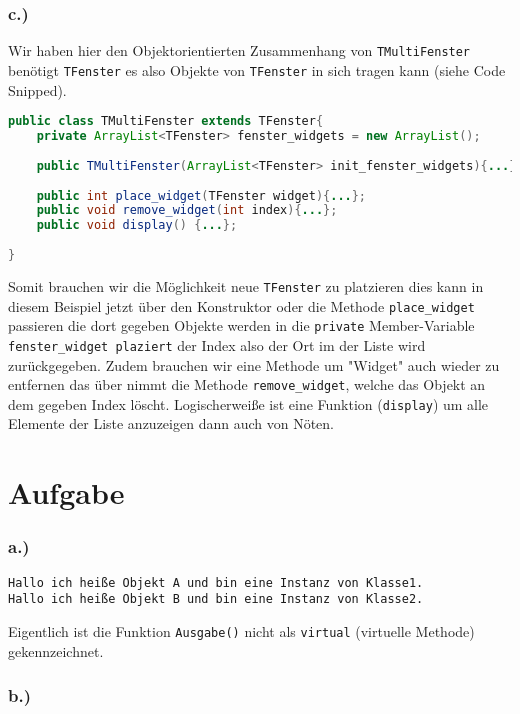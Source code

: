 \documentclass[12pt]{article}
\begin{document}
\subsubsection*{c.)}
Wir haben hier den Objektorientierten Zusammenhang von \verb|TMultiFenster| benötigt \verb|TFenster| es also Objekte von \verb|TFenster| in sich tragen kann (siehe Code Snipped).

\lstset{language=Java}
\begin{lstlisting}[language=Java]
public class TMultiFenster extends TFenster{
	private ArrayList<TFenster> fenster_widgets = new ArrayList();
	
	public TMultiFenster(ArrayList<TFenster> init_fenster_widgets){...};
	
	public int place_widget(TFenster widget){...};
	public void remove_widget(int index){...};
	public void display() {...};	
	
}
\end{lstlisting}

Somit brauchen wir die Möglichkeit neue \verb|TFenster| zu platzieren dies kann in diesem Beispiel jetzt über den Konstruktor oder die Methode \verb|place_widget| passieren die dort gegeben Objekte werden in die \verb|private| Member-Variable \verb|fenster_widget plaziert| der Index also der Ort im der Liste wird zurückgegeben. Zudem brauchen wir eine Methode um "Widget" auch wieder zu entfernen das über nimmt die Methode \verb|remove_widget|, welche das Objekt an dem gegeben Index löscht. Logischerweiße ist eine Funktion (\verb|display|) um alle Elemente der Liste anzuzeigen dann auch von Nöten.

\section*{Aufgabe}
\subsubsection*{a.)}


\begin{lstlisting}
Hallo ich heiße Objekt A und bin eine Instanz von Klasse1.
Hallo ich heiße Objekt B und bin eine Instanz von Klasse2.
\end{lstlisting}

Eigentlich ist die Funktion \verb|Ausgabe()| nicht als \verb|virtual| (virtuelle Methode) gekennzeichnet.

\subsubsection*{b.)}
\end{document}
